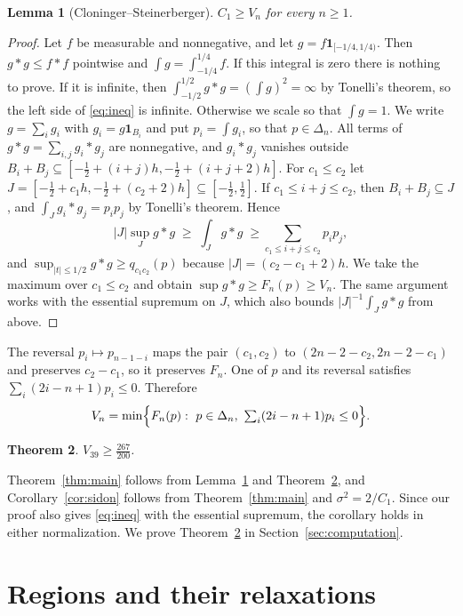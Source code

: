 \documentclass[11pt]{amsart}
\newtheorem{theorem}{Theorem}[section]
\newtheorem{lemma}[theorem]{Lemma}
\theoremstyle{definition}
\theoremstyle{remark}
\numberwithin{equation}{section}
\newcommand{\one}{\mathbf{1}}
\newcommand{\LAM}{\tfrac{267}{200}}
\newcommand{\Nbins}{39}
\begin{document}
\begin{lemma}[Cloninger--Steinerberger]\label{lem:window}
$C_1\ge V_n$ for every $n\ge1$.
\end{lemma}

\begin{proof}
Let $f$ be measurable and nonnegative, and let $g=f\one_{[-1/4,1/4)}$. Then $g*g\le f*f$ pointwise and $\int g=\int_{-1/4}^{1/4}f$. If this integral is zero there is nothing to prove. If it is infinite, then $\int_{-1/2}^{1/2}g*g=(\int g)^2=\infty$ by Tonelli's theorem, so the left side of \eqref{eq:ineq} is infinite. Otherwise we scale so that $\int g=1$. We write $g=\sum_ig_i$ with $g_i=g\one_{B_i}$ and put $p_i=\int g_i$, so that $p\in\Delta_n$. All terms of $g*g=\sum_{i,j}g_i*g_j$ are nonnegative, and $g_i*g_j$ vanishes outside $B_i+B_j\subseteq[-\tfrac12+(i+j)h,-\tfrac12+(i+j+2)h]$. For $c_1\le c_2$ let $J=[-\tfrac12+c_1h,-\tfrac12+(c_2+2)h]\subseteq[-\tfrac12,\tfrac12]$. If $c_1\le i+j\le c_2$, then $B_i+B_j\subseteq J$, and $\int_Jg_i*g_j=p_ip_j$ by Tonelli's theorem. Hence
\[
|J|\sup_J g*g\;\ge\;\int_Jg*g\;\ge\sum_{c_1\le i+j\le c_2}p_ip_j,
\]
and $\sup_{|t|\le1/2}g*g\ge q_{c_1c_2}(p)$ because $|J|=(c_2-c_1+2)h$. We take the maximum over $c_1\le c_2$ and obtain $\sup g*g\ge F_n(p)\ge V_n$. The same argument works with the essential supremum on $J$, which also bounds $|J|^{-1}\int_Jg*g$ from above.
\end{proof}

The reversal $p_i\mapsto p_{n-1-i}$ maps the pair $(c_1,c_2)$ to $(2n-2-c_2,2n-2-c_1)$ and preserves $c_2-c_1$, so it preserves $F_n$. One of $p$ and its reversal satisfies $\sum_i(2i-n+1)p_i\le0$. Therefore
\begin{equation}\label{eq:half}
V_n=\min\Bigl\{F_n(p):\ p\in\Delta_n,\ \textstyle\sum_i(2i-n+1)p_i\le0\Bigr\}.
\end{equation}

\begin{theorem}\label{thm:Vn}
$V_{\Nbins}\ge\LAM$.
\end{theorem}

Theorem~\ref{thm:main} follows from Lemma~\ref{lem:window} and Theorem~\ref{thm:Vn}, and Corollary~\ref{cor:sidon} follows from Theorem~\ref{thm:main} and $\sigma^2=2/C_1$. Since our proof also gives \eqref{eq:ineq} with the essential supremum, the corollary holds in either normalization. We prove Theorem~\ref{thm:Vn} in Section~\ref{sec:computation}.

\section{Regions and their relaxations}\label{sec:bb}
\end{document}
